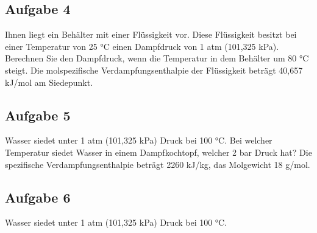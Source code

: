 \documentclass[a4paper,11pt]{article}
\newif\ifshowme
\begin{document}
\subsection*{Aufgabe 4}
Ihnen liegt ein Behälter mit einer Flüssigkeit vor. Diese Flüssigkeit besitzt bei einer
Temperatur von 25 °C einen Dampfdruck von 1 atm (101,325 kPa). Berechnen Sie den
Dampfdruck, wenn die Temperatur in dem Behälter um 80 °C steigt. Die molspezifische
Verdampfungsenthalpie der Flüssigkeit beträgt 40,657 kJ/mol am Siedepunkt. 
\ifshowme
\antwort{
\begin{align*}
\ln(p_3) &= \frac{40.657 ~\text{J / mol}}{8,314 ~\text{J / (mol K)}} \cdot \left( \frac{1}{298,15} - \frac{1}{378,15} \right) + \ln(101,325 \cdot 10^3 ~\text{Pa}) \\
&= 14,99 \qquad \qquad| e^x \\ \\
p_3 &= 3.255.914,7 ~\text{Pa} \\
&= 32,5 ~\text{bar}
\end{align*}

}
\else
\fi


\subsection*{Aufgabe 5}
Wasser siedet unter 1 atm (101,325 kPa) Druck bei 100 °C. Bei welcher Temperatur siedet
Wasser in einem Dampfkochtopf, welcher 2 bar Druck hat? Die spezifische
Verdampfungsenthalpie beträgt 2260 kJ/kg, das Molgewicht 18 g/mol.
\ifshowme
\antwort{

\begin{align*}
\ln(\frac{p_2}{p_1})\frac{R}{\Delta h_{vM}}+\frac{1}{T_2}&=\frac{1}{T_1} \\
\ln(\frac{101.325}{200.000}) \cdot \frac{8,314 ~\text{J/(mol K)}}{2,26 \cdot 10^6 ~\text{J/kg} \cdot 0,018 ~\text{kg/mol}}+\frac{1}{373,15 ~\text{K}}&=2,541 \cdot 10^{-3} \cdot ~\text{K}^{-1} \qquad | :\frac{1}{x} \\ 
&=393,55 ~\text{K}
\end{align*} 

}
\else
\fi


\subsection*{Aufgabe 6}
Wasser siedet unter 1 atm (101,325 kPa) Druck bei 100 °C.
\end{document}
